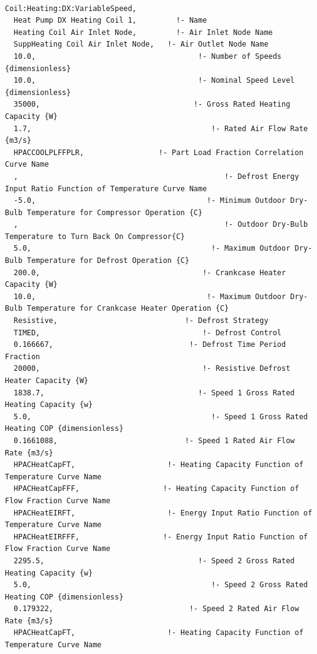 \begin{lstlisting}

Coil:Heating:DX:VariableSpeed,
  Heat Pump DX Heating Coil 1,         !- Name
  Heating Coil Air Inlet Node,         !- Air Inlet Node Name
  SuppHeating Coil Air Inlet Node,   !- Air Outlet Node Name
  10.0,                                     !- Number of Speeds {dimensionless}
  10.0,                                     !- Nominal Speed Level {dimensionless}
  35000,                                   !- Gross Rated Heating Capacity {W}
  1.7,                                         !- Rated Air Flow Rate {m3/s}
  HPACCOOLPLFFPLR,                 !- Part Load Fraction Correlation Curve Name
  ,                                               !- Defrost Energy Input Ratio Function of Temperature Curve Name
  -5.0,                                       !- Minimum Outdoor Dry-Bulb Temperature for Compressor Operation {C}
  ,                                               !- Outdoor Dry-Bulb Temperature to Turn Back On Compressor{C}
  5.0,                                         !- Maximum Outdoor Dry-Bulb Temperature for Defrost Operation {C}
  200.0,                                     !- Crankcase Heater Capacity {W}
  10.0,                                       !- Maximum Outdoor Dry-Bulb Temperature for Crankcase Heater Operation {C}
  Resistive,                             !- Defrost Strategy
  TIMED,                                     !- Defrost Control
  0.166667,                               !- Defrost Time Period Fraction
  20000,                                     !- Resistive Defrost Heater Capacity {W}
  1838.7,                                   !- Speed 1 Gross Rated Heating Capacity {w}
  5.0,                                         !- Speed 1 Gross Rated Heating COP {dimensionless}
  0.1661088,                             !- Speed 1 Rated Air Flow Rate {m3/s}
  HPACHeatCapFT,                     !- Heating Capacity Function of Temperature Curve Name
  HPACHeatCapFFF,                   !- Heating Capacity Function of Flow Fraction Curve Name
  HPACHeatEIRFT,                     !- Energy Input Ratio Function of Temperature Curve Name
  HPACHeatEIRFFF,                   !- Energy Input Ratio Function of Flow Fraction Curve Name
  2295.5,                                   !- Speed 2 Gross Rated Heating Capacity {w}
  5.0,                                         !- Speed 2 Gross Rated Heating COP {dimensionless}
  0.179322,                               !- Speed 2 Rated Air Flow Rate {m3/s}
  HPACHeatCapFT,                     !- Heating Capacity Function of Temperature Curve Name

\end{lstlisting}
